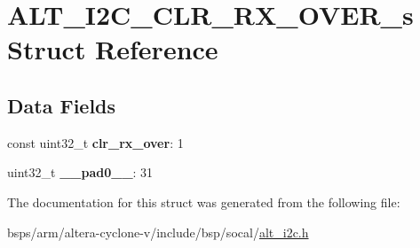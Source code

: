 \hypertarget{structALT__I2C__CLR__RX__OVER__s}{}\section{A\+L\+T\+\_\+\+I2\+C\+\_\+\+C\+L\+R\+\_\+\+R\+X\+\_\+\+O\+V\+E\+R\+\_\+s Struct Reference}
\label{structALT__I2C__CLR__RX__OVER__s}
\subsection*{Data Fields}
\begin{DoxyCompactItemize}
\item 
\mbox{\label{structALT__I2C__CLR__RX__OVER__s_af04a7c968a6cca3a5e99ad6d3100f03e}} 
const uint32\+\_\+t {\bfseries clr\+\_\+rx\+\_\+over}\+: 1
\item 
\mbox{\label{structALT__I2C__CLR__RX__OVER__s_a79403a3ce08e5ecc2aca7fb91dffb07a}} 
uint32\+\_\+t {\bfseries \+\_\+\+\_\+pad0\+\_\+\+\_\+}\+: 31
\end{DoxyCompactItemize}


The documentation for this struct was generated from the following file\+:\begin{DoxyCompactItemize}
\item 
bsps/arm/altera-\/cyclone-\/v/include/bsp/socal/\mbox{\hyperlink{socal_2alt__i2c_8h}{alt\+\_\+i2c.\+h}}\end{DoxyCompactItemize}

